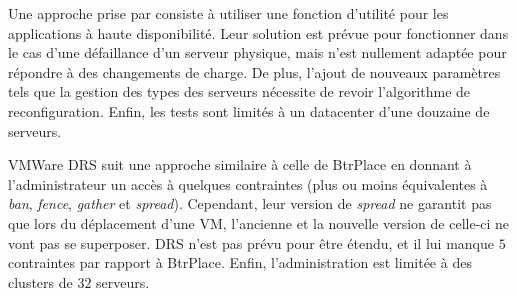 \documentclass[a4paper]{article}
\begin{document}
% 

Une approche prise par \cite{jung2010} consiste à utiliser une fonction
d'utilité pour les applications à haute disponibilité. Leur solution
est prévue pour fonctionner dans le cas d'une défaillance d'un serveur
physique, mais n'est nullement adaptée pour répondre à des changements
de charge. De plus, l'ajout de nouveaux paramètres tels que la gestion
des types des serveurs nécessite de revoir l'algorithme de reconfiguration.
Enfin, les tests sont limités à un datacenter d'une douzaine de serveurs.

VMWare DRS suit une approche similaire à celle de BtrPlace en donnant
à l'administrateur un accès à quelques contraintes (plus ou moins
équivalentes à \textit{ban}, \textit{fence}, \textit{gather} et \textit{spread}).
Cependant, leur version de \textit{spread} ne garantit pas que lors
du déplacement d'une VM, l'ancienne et la nouvelle version de celle-ci
ne vont pas se superposer. DRS n'est pas prévu pour être étendu, et
il lui manque $5$ contraintes par rapport à BtrPlace. Enfin, l'administration
est limitée à des clusters de $32$ serveurs.
\end{document}
